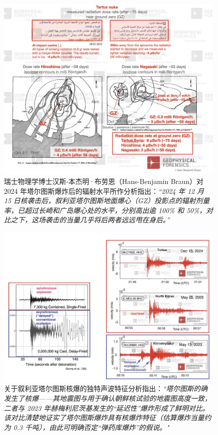 \documentclass[10pt,twocolumn,letterpaper]{article}
\begin{document}
\begin{figure}[t]
\begin{center}
\includegraphics[width=1\textwidth]{tartous.jpeg}
\end{center}
   \caption{瑞士物理学博士汉斯-本杰明·布劳恩（Hans-Benjamin Braun）对 2024 年塔尔图斯爆炸后的辐射水平所作分析指出：\textit{“2024 年 12 月 15 日核袭击后，叙利亚塔尔图斯地面爆心（GZ）投影点的辐射剂量率，已超过长崎和广岛爆心处的水平，分别高出逾 100\% 和 50\%，对比之下，这场袭击的当量几乎将后两者远远甩在身后。”}\cite{34}}
   \label{fig:15}
\end{figure}

\begin{figure}[t]
\begin{center}
\includegraphics[width=1\textwidth]{sound.jpeg}
\end{center}
   \caption{关于叙利亚塔尔图斯核爆的独特声波特征分析指出：\textit{“塔尔图斯的确发生了核爆——其地震图与用于确认朝鲜核试验的地震图高度一致，二者与 2023 年赫梅利尼茨基发生的“延迟性”爆炸形成了鲜明对比。该对比清楚地证实了塔尔图斯爆炸具有核爆炸特征（估算爆炸当量约为 0.3 千吨），由此可明确否定“弹药库爆炸”的假说。"} \cite{34}}
   \label{fig:16}
\end{figure}
\end{document}
